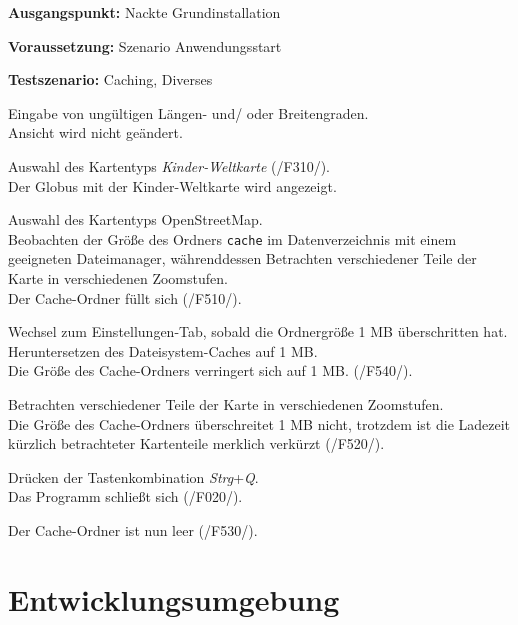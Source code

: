 \documentclass[10pt]{scrreprt}
\newcommand{\sfbf}[1]{\textbf{\sffamily #1}}
\newcommand{\ziel}[1]{{\fontsize{9.5}{11}\textsf{/#1/}}}
\newenvironment{details}[1][6pt]{%
  \parskip#1 \parindent6mm \raggedright%
  \def\item{\par\ignorespaces\hangindent=5mm \hangafter1}}{%
  \par\ignorespaces}
\begin{document}
\vspace{1.0cm}
\begin{details}[2pt]
\item \sfbf{Ausgangspunkt:} Nackte Grundinstallation 
\item \sfbf{Voraussetzung:} Szenario Anwendungsstart
\item \sfbf{Testszenario:} Caching, Diverses
\end{details}
\vspace{2mm}
\begin{enumerate}[leftmargin = 2.2cm, resume]
\item Eingabe von ungültigen Längen- und/ oder Breitengraden.\\ Ansicht wird nicht geändert.
\item Auswahl des Kartentyps \textit{Kinder-Weltkarte} (\ziel{F310}).\\Der Globus mit der Kinder-Weltkarte wird angezeigt.
\item Auswahl des Kartentyps OpenStreetMap.\\Beobachten der Größe des Ordners \texttt{cache} im Datenverzeichnis mit einem geeigneten Dateimanager, währenddessen Betrachten verschiedener Teile der Karte in verschiedenen Zoomstufen.\\Der Cache-Ordner füllt sich (\ziel{F510}).
\item Wechsel zum Einstellungen-Tab, sobald die Ordnergröße 1 MB überschritten hat.\\Heruntersetzen des Dateisystem-Caches auf 1 MB.\\Die Größe des Cache-Ordners verringert sich auf 1 MB. (\ziel{F540}).
\item Betrachten verschiedener Teile der Karte in verschiedenen Zoomstufen.\\ Die Größe des Cache-Ordners überschreitet 1 MB nicht, trotzdem ist die Ladezeit kürzlich betrachteter Kartenteile merklich verkürzt (\ziel{F520}).
\item Drücken der Tastenkombination \textit{Strg}+\textit{Q}.\\Das Programm schließt sich (\ziel{F020}).
\item Der Cache-Ordner ist nun leer (\ziel{F530}).
\end{enumerate}



\chapter{Entwicklungsumgebung}
\end{document}
